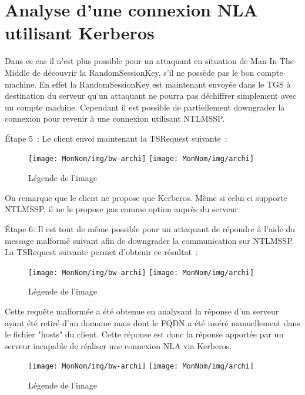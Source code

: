 \section{Analyse d'une connexion NLA utilisant Kerberos}
Dans ce cas il n’est plus possible pour un attaquant en situation de Man-In-The-Middle de découvrir la RandomSessionKey, s’il ne possède pas le bon compte machine. En effet la RandomSessionKey est maintenant envoyée dans le TGS à destination du serveur qu’un attaquant ne pourra pas déchiffrer simplement avec un compte machine.
Cependant il est possible de partiellement downgrader la connexion pour revenir à une connexion utilisant NTLMSSP.

Étape 5 :
Le client envoi maintenant la TSRequest suivante :

\begin{figure}[ht]
  \centering
  \ifssticbw
    \texttt{[image: MonNom/img/bw-archi]}
  \else
    \texttt{[image: MonNom/img/archi]}
  \fi
  \caption{Légende de l'image}
  \label{fig:monnom:archi}
\end{figure}

On remarque que le client ne propose que Kerberos. Même si celui-ci supporte NTLMSSP, il ne le propose pas comme option auprès du serveur.

Étape 6: 
Il est tout de même possible pour un attaquant de répondre à l'aide du message malformé suivant afin de downgrader la communication sur NTLMSSP. La TSRequest suivante permet d'obtenir ce résultat :

\begin{figure}[ht]
  \centering
  \ifssticbw
    \texttt{[image: MonNom/img/bw-archi]}
  \else
    \texttt{[image: MonNom/img/archi]}
  \fi
  \caption{Légende de l'image}
  \label{fig:monnom:archi}
\end{figure}

Cette requête malformée a été obtenue en analysant la réponse d'un serveur ayant été retiré d'un domaine mais dont le FQDN a été inséré manuellement dans le fichier "hosts" du client. Cette réponse est donc la réponse apportée par un serveur incapable de réaliser une connexion NLA via Kerberos.

\begin{figure}[ht]
  \centering
  \ifssticbw
    \texttt{[image: MonNom/img/bw-archi]}
  \else
    \texttt{[image: MonNom/img/archi]}
  \fi
  \caption{Légende de l'image}
  \label{fig:monnom:archi}
\end{figure}


